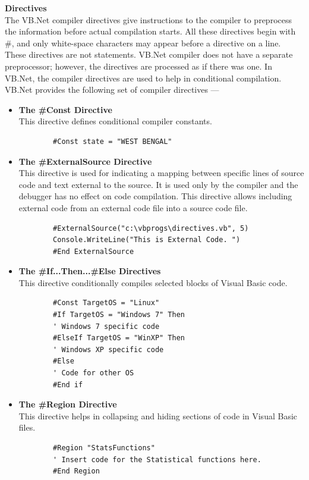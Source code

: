 \documentclass[11pt,dvipsnames,cmyk]{article}
\begin{document}
	\hfill\break\textbf{Directives}\\
	The VB.Net compiler directives give instructions to the compiler to preprocess the information before actual compilation starts. All these directives begin with \#, and only white-space characters may appear before a directive on a line. These directives are not statements. VB.Net compiler does not have a separate preprocessor; however, the directives are processed as if there was one. In VB.Net, the compiler directives are used to help in conditional compilation.\\
	VB.Net provides the following set of compiler directives ---
	\begin{itemize}
		\item \textbf{The \#Const Directive}\\
		This directive defines conditional compiler constants.
		\begin{verbatim}
		#Const state = "WEST BENGAL"
		\end{verbatim}
		
		\item \textbf{The \#ExternalSource Directive}\\
		This directive is used for indicating a mapping between specific lines of source code and text external to the source. It is used only by the compiler and the debugger has no effect on code compilation. This directive allows including external code from an external code file into a source code file.
		\begin{verbatim}
		#ExternalSource("c:\vbprogs\directives.vb", 5)
		Console.WriteLine("This is External Code. ")
		#End ExternalSource
		\end{verbatim}
		
		\item \textbf{The \#If...Then...\#Else Directives}\\
		This directive conditionally compiles selected blocks of Visual Basic code.
		\begin{verbatim}
		#Const TargetOS = "Linux"
		#If TargetOS = "Windows 7" Then
		' Windows 7 specific code
		#ElseIf TargetOS = "WinXP" Then
		' Windows XP specific code
		#Else
		' Code for other OS
		#End if
		\end{verbatim}
		
		\item \textbf{The \#Region Directive}\\
		This directive helps in collapsing and hiding sections of code in Visual Basic files.
		\begin{verbatim}
		#Region "StatsFunctions" 
		' Insert code for the Statistical functions here.
		#End Region
		\end{verbatim}
	 \end{itemize}
 
\end{document}
